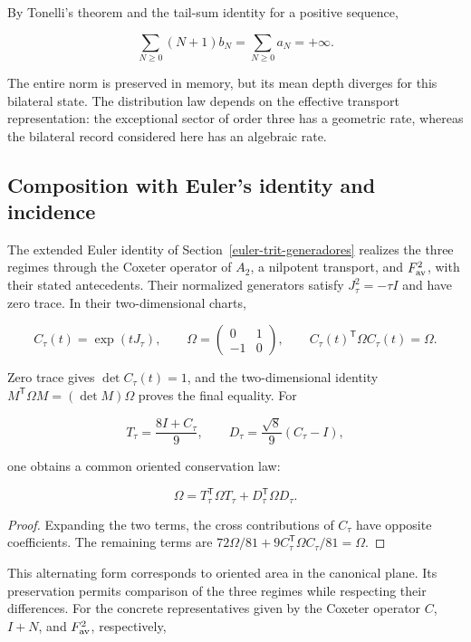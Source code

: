 By Tonelli's theorem and the tail-sum identity for a positive sequence,

\begin{equation}
\sum_{N\geq0}(N+1)b_N=\sum_{N\geq0}a_N=+\infty.
\label{nuc03:eq:21}
\end{equation}

The entire norm is preserved in memory, but its mean depth diverges for this bilateral state. The distribution law depends on the effective transport representation: the exceptional sector of order three has a geometric rate, whereas the bilateral record considered here has an algebraic rate.

\subsection{Composition with Euler's identity and incidence}

The extended Euler identity of Section~\ref{euler-trit-generadores} realizes the three regimes through the Coxeter operator of \(A_2\), a nilpotent transport, and \(F_{\rm av}^2\), with their stated antecedents. Their normalized generators satisfy \(J_\tau^2=-\tau I\) and have zero trace. In their two-dimensional charts,

\[
C_\tau(t)=\exp(tJ_\tau),\qquad
\Omega=\begin{pmatrix}0&1\\-1&0\end{pmatrix},\qquad
C_\tau(t)^\mathsf T\Omega C_\tau(t)=\Omega.
\]

Zero trace gives \(\det C_\tau(t)=1\), and the two-dimensional identity \(M^\mathsf T\Omega M=(\det M)\Omega\) proves the final equality. For

\[
T_\tau=\frac{8I+C_\tau}{9},\qquad
D_\tau=\frac{\sqrt8}{9}(C_\tau-I),
\]

one obtains a common oriented conservation law:

\begin{equation}
\boxed{\Omega=T_\tau^\mathsf T\Omega T_\tau+D_\tau^\mathsf T\Omega D_\tau.}
\label{nuc03:eq:22}
\end{equation}

\begin{proof}
Expanding the two terms, the cross contributions of \(C_\tau\) have opposite coefficients. The remaining terms are \(72\Omega/81+9C_\tau^\mathsf T\Omega C_\tau/81=\Omega\).
\end{proof}

This alternating form corresponds to oriented area in the canonical plane. Its preservation permits comparison of the three regimes while respecting their differences. For the concrete representatives given by the Coxeter operator \(C\), \(I+N\), and \(F_{\rm av}^2\), respectively,

